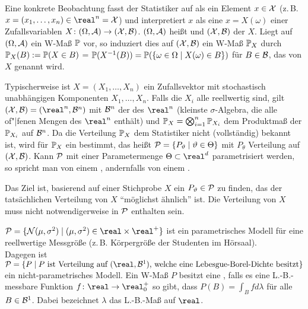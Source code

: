 \begin{Bem}
    Eine konkrete Beobachtung fasst der Statistiker auf als ein Element $x \in \X$
    (z.\,B. $x = (x_1, \dotsc, x_n) \in \real^n = \X$) und interpretiert $x$ als eine
     $x = X(\omega)$ einer Zufallsvariablen
    $X\colon (\Omega, \A) \rightarrow (\X, \B)$.
    $(\Omega, \A)$ heißt  und $(\X, \B)$ 
    der  $X$.
    Liegt auf $(\Omega, \A)$ ein W-Maß $\PP$ vor, so induziert dies auf $(\X, \B)$
    ein W-Maß $\PP_X$ durch $\PP_X(B) := \PP(X \in B)$ =
    $\PP(X^{-1}(B)) = \PP(\{\omega \in \Omega \;|\; X(\omega) \in B\})$ für $B \in \B$,
    das  von $X$ genannt wird.
    
    Typischerweise ist $X = (X_1, \dotsc, X_n)$ ein Zufallsvektor mit stochastisch unabhängigen
    Komponenten $X_1, \dotsc, X_n$.
    Falls die $X_i$ alle reellwertig sind, gilt $(\X, \B) = (\real^n, \B^n)$ mit
    $\B^n$ der  des $\real^n$
    (kleinste $\sigma$-Algebra, die alle of"|fenen Mengen des $\real^n$ enthält) und
    $\PP_X = \bigotimes_{i=1}^n \PP_{X_i}$ dem Produktmaß der $\PP_{X_i}$ auf $\B^n$.
    Da die Verteilung $\PP_X$ dem Statistiker nicht (vollständig) bekannt ist, wird für $\PP_X$
    ein  bestimmt, das heißt
    $\P = \{P_\theta \;|\; \theta \in \Theta\}$ mit $P_\theta$ Verteilung auf $(\X, \B)$.
    Kann $\P$ mit einer Parametermenge $\Theta \subset \real^d$ parametrisiert werden,
    so spricht man von einem , andernfalls von einem
    .
    
    Das Ziel ist, basierend auf einer Stichprobe $X$ ein $P_\theta \in \P$ zu finden,
    das der tatsächlichen Verteilung von $X$ "`möglichst ähnlich"' ist.
    Die Verteilung von $X$ muss nicht notwendigerweise in $\P$ enthalten sein.
\end{Bem}

\begin{Bsp}
    $\P = \{\N(\mu, \sigma^2) \;|\; (\mu, \sigma^2) \in \real \times \real^+\}$
    ist ein parametrisches Modell für eine reellwertige Messgröße
    (z.\,B. Körpergröße der Studenten im Hörsaal).\\
    Dagegen ist $\P = \{P \;|\; P \text{ ist Verteilung auf } (\real, \B^1)\text{, welche
    eine Lebesgue-Borel-Dichte besitzt}\}$ ein nicht-parametrisches Modell.
    Ein W-Maß $P$ besitzt eine , falls es eine L.-B.-messbare Funktion
    $f\colon \real \rightarrow \real_0^+$ so gibt, dass $P(B) = \int_B f d\lambda$ für alle
    $B \in \B^1$.
    Dabei bezeichnet $\lambda$ das L.-B.-Maß auf $\real$.
\end{Bsp}

